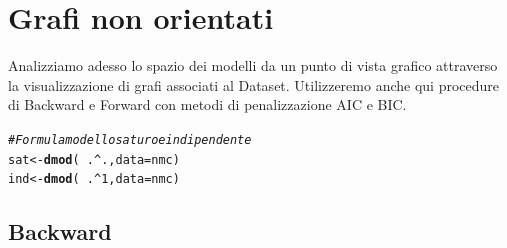 \documentclass{article}\usepackage[]{graphicx}\usepackage[]{xcolor}
\makeatletter
\newcommand{\hlnum}[1]{\textcolor[rgb]{0.686,0.059,0.569}{#1}}%
\newcommand{\hlcom}[1]{\textcolor[rgb]{0.678,0.584,0.686}{\textit{#1}}}%
\newcommand{\hlopt}[1]{\textcolor[rgb]{0,0,0}{#1}}%
\newcommand{\hlstd}[1]{\textcolor[rgb]{0.345,0.345,0.345}{#1}}%
\newcommand{\hlkwb}[1]{\textcolor[rgb]{0.69,0.353,0.396}{#1}}%
\newcommand{\hlkwc}[1]{\textcolor[rgb]{0.333,0.667,0.333}{#1}}%
\newcommand{\hlkwd}[1]{\textcolor[rgb]{0.737,0.353,0.396}{\textbf{#1}}}%
\newenvironment{kframe}{%
 \def\at@end@of@kframe{}%
 \ifinner\ifhmode%
  \def\at@end@of@kframe{\end{minipage}}%
  \begin{minipage}{\columnwidth}%
 \fi\fi%
 \def\FrameCommand##1{\hskip\@totalleftmargin \hskip-\fboxsep
 \colorbox{shadecolor}{##1}\hskip-\fboxsep
     \hskip-\linewidth \hskip-\@totalleftmargin \hskip\columnwidth}%
 \MakeFramed {\advance\hsize-\width
   \@totalleftmargin\z@ \linewidth\hsize
   \@setminipage}}%
 {\par\unskip\endMakeFramed%
 \at@end@of@kframe}
\newenvironment{knitrout}{}{} %
\makeatother
\begin{document}
\clearpage




\section{Grafi non orientati}
  Analizziamo adesso lo spazio dei modelli da un punto di vista grafico attraverso la 
  visualizzazione di grafi associati al Dataset. Utilizzeremo anche qui
  procedure di Backward e Forward con metodi di penalizzazione AIC e BIC.
  
\begin{knitrout}
\color{fgcolor}\begin{kframe}
\begin{alltt}
\hlcom{#Formula modello saturo e indipendente}
\hlstd{sat} \hlkwb{<-} \hlkwd{dmod}\hlstd{(}\hlopt{~}\hlstd{.}\hlopt{^}\hlstd{.,} \hlkwc{data}\hlstd{=nmc)}
\hlstd{ind} \hlkwb{<-} \hlkwd{dmod}\hlstd{(}\hlopt{~}\hlstd{.}\hlopt{^}\hlnum{1}\hlstd{,} \hlkwc{data}\hlstd{=nmc)}
\end{alltt}
\end{kframe}
\end{knitrout}
  
  \subsection{Backward}
  
\end{document}
